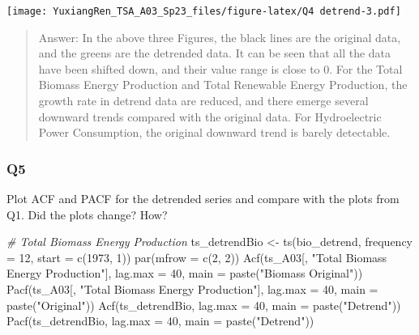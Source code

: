 \documentclass[
]{article}
\newenvironment{Shaded}{\begin{snugshade}}{\end{snugshade}}
\newcommand{\AttributeTok}[1]{\textcolor[rgb]{0.77,0.63,0.00}{#1}}
\newcommand{\CommentTok}[1]{\textcolor[rgb]{0.56,0.35,0.01}{\textit{#1}}}
\newcommand{\DecValTok}[1]{\textcolor[rgb]{0.00,0.00,0.81}{#1}}
\newcommand{\FunctionTok}[1]{\textcolor[rgb]{0.00,0.00,0.00}{#1}}
\newcommand{\NormalTok}[1]{#1}
\newcommand{\OtherTok}[1]{\textcolor[rgb]{0.56,0.35,0.01}{#1}}
\newcommand{\StringTok}[1]{\textcolor[rgb]{0.31,0.60,0.02}{#1}}
\begin{document}
\texttt{[image: YuxiangRen\_TSA\_A03\_Sp23\_files/figure-latex/Q4 detrend-3.pdf]}

\begin{quote}
Answer: In the above three Figures, the black lines are the original
data, and the greens are the detrended data. It can be seen that all the
data have been shifted down, and their value range is close to 0. For
the Total Biomass Energy Production and Total Renewable Energy
Production, the growth rate in detrend data are reduced, and there
emerge several downward trends compared with the original data. For
Hydroelectric Power Consumption, the original downward trend is barely
detectable.
\end{quote}

\hypertarget{q5}{%
\subsubsection{Q5}\label{q5}}

Plot ACF and PACF for the detrended series and compare with the plots
from Q1. Did the plots change? How?

\begin{Shaded}
\begin{Highlighting}[]
\CommentTok{\# Total Biomass Energy Production}
\NormalTok{ts\_detrendBio }\OtherTok{\textless{}{-}} \FunctionTok{ts}\NormalTok{(bio\_detrend, }\AttributeTok{frequency =} \DecValTok{12}\NormalTok{, }\AttributeTok{start =} \FunctionTok{c}\NormalTok{(}\DecValTok{1973}\NormalTok{, }\DecValTok{1}\NormalTok{))}
\FunctionTok{par}\NormalTok{(}\AttributeTok{mfrow =} \FunctionTok{c}\NormalTok{(}\DecValTok{2}\NormalTok{, }\DecValTok{2}\NormalTok{))}
\FunctionTok{Acf}\NormalTok{(ts\_A03[, }\StringTok{"Total Biomass Energy Production"}\NormalTok{], }\AttributeTok{lag.max =} \DecValTok{40}\NormalTok{, }\AttributeTok{main =} \FunctionTok{paste}\NormalTok{(}\StringTok{"Biomass Original"}\NormalTok{))}
\FunctionTok{Pacf}\NormalTok{(ts\_A03[, }\StringTok{"Total Biomass Energy Production"}\NormalTok{], }\AttributeTok{lag.max =} \DecValTok{40}\NormalTok{, }\AttributeTok{main =} \FunctionTok{paste}\NormalTok{(}\StringTok{"Original"}\NormalTok{))}
\FunctionTok{Acf}\NormalTok{(ts\_detrendBio, }\AttributeTok{lag.max =} \DecValTok{40}\NormalTok{, }\AttributeTok{main =} \FunctionTok{paste}\NormalTok{(}\StringTok{"Detrend"}\NormalTok{))}
\FunctionTok{Pacf}\NormalTok{(ts\_detrendBio, }\AttributeTok{lag.max =} \DecValTok{40}\NormalTok{, }\AttributeTok{main =} \FunctionTok{paste}\NormalTok{(}\StringTok{"Detrend"}\NormalTok{))}
\end{Highlighting}
\end{Shaded}
\end{document}

